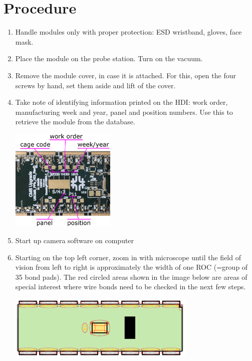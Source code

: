 \documentclass[12pt]{unlsilabsop}
\begin{document}
\section{Procedure}

\begin{enumerate}
    \item Handle modules only with proper protection: ESD wristband, gloves, face mask.
    \item Place the module on the probe station. Turn on the vacuum.
    \item Remove the module cover, in case it is attached. For this, open the four screws by hand, set them aside and lift of the cover.
    \item Take note of identifying information printed on the HDI: work order, manufacturing week and year, panel and position numbers. Use this to retrieve the module from the database.

    \begin{center}
        \includegraphics[width=5cm]{img/HDIRevD_id.png}
    \end{center}

    \item Start up camera software on computer
    \item Starting on the top left corner, zoom in with microscope until the field of vision from left to right is approximately the width of one ROC (=group of 35 bond pads). The red circled areas shown in the image below are areas of special interest where wire bonds need to be checked in the next few steps.

    \begin{center}
        \includegraphics[width=9cm]{img/ModuleSchematicInpsection.pdf}
    \end{center}


\end{enumerate}
\end{document}
